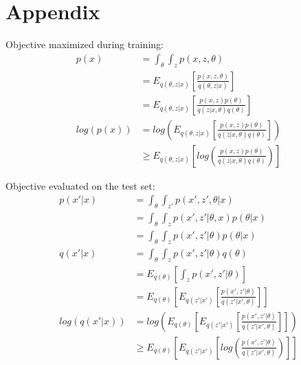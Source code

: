 \documentclass{article}
\begin{document}




\newpage 

\section{Appendix}

Objective maximized during training:
\begin{align}
    p(x) &= \int_{\theta} \int_{z} p(x,z,\theta) \\
    &= E_{q(\theta,z|x)} \left[ \frac{p(x,z,\theta)}{q(\theta,z|x)} \right ] \\
    &= E_{q(\theta,z|x)} \left[ \frac{p(x,z)p(\theta)}{q(z|x,\theta)q(\theta)} \right ] \\
    log(p(x)) &= log \left( E_{q(\theta,z|x)} \left[ \frac{p(x,z)p(\theta)}{q(z|x,\theta)q(\theta)} \right ] \right) \\
    &\geq  E_{q(\theta,z|x)} \left[ log \left( \frac{p(x,z)p(\theta)}{q(z|x,\theta)q(\theta)} \right) \right ] 
\end{align}


Objective evaluated on the test set:
\begin{align}
    p(x'|x) &= \int_{\theta} \int_{z'} p(x',z',\theta|x) \\
    &= \int_{\theta} \int_{z} p(x',z'|\theta,x) p(\theta|x) \\
    &= \int_{\theta} \int_{z} p(x',z'|\theta) p(\theta|x) \\
    q(x'|x) &= \int_{\theta} \int_{z} p(x',z'|\theta) q(\theta) \\
    &= E_{q(\theta)} \left[ \int_{z} p(x',z'|\theta) \right] \\
    &= E_{q(\theta)} \left[ E_{q(z'|x')} \left[ \frac{p(x',z'|\theta)}{q(z'|x',\theta)} \right] \right]  \\
    log(q(x'|x)) &= log \left(  E_{q(\theta)} \left[ E_{q(z'|x')} \left[ \frac{p(x',z'|\theta)}{q(z'|x',\theta)}  \right ] \right ] \right) \\
    &\geq   E_{q(\theta)} \left[ E_{q(z'|x')} \left[ log \left( \frac{p(x',z'|\theta)}{q(z'|x',\theta)} \right) \right ] \right ] 
\end{align}
\end{document}

